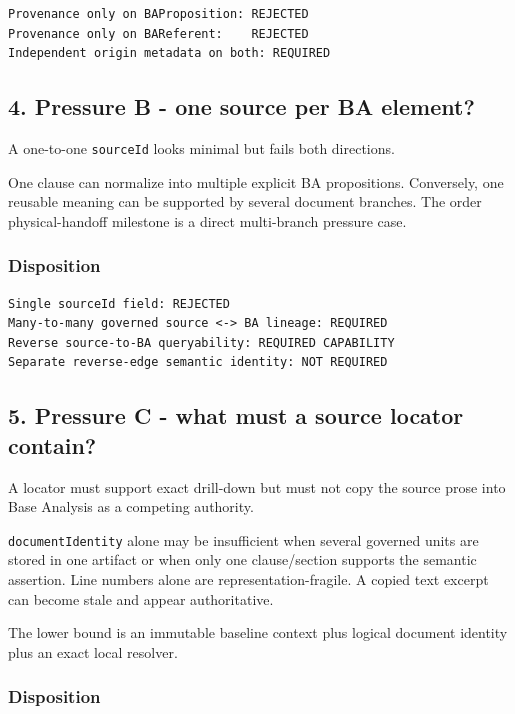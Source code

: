 \documentclass[11pt,a4paper]{article}
\begin{document}
\begin{verbatim}
Provenance only on BAProposition: REJECTED
Provenance only on BAReferent:    REJECTED
Independent origin metadata on both: REQUIRED
\end{verbatim}

\subsection{4. Pressure B - one source per BA element?}\label{4-pressure-b---one-source-per-ba-element}

A one-to-one \texttt{sourceId} looks minimal but fails both directions.

One clause can normalize into multiple explicit BA propositions. Conversely, one reusable meaning can be supported by several document branches. The order physical-handoff milestone is a direct multi-branch pressure case.

\subsubsection{Disposition}\label{disposition-1}

\begin{verbatim}
Single sourceId field: REJECTED
Many-to-many governed source <-> BA lineage: REQUIRED
Reverse source-to-BA queryability: REQUIRED CAPABILITY
Separate reverse-edge semantic identity: NOT REQUIRED
\end{verbatim}

\subsection{5. Pressure C - what must a source locator contain?}\label{5-pressure-c---what-must-a-source-locator-contain}

A locator must support exact drill-down but must not copy the source prose into Base Analysis as a competing authority.

\texttt{documentIdentity} alone may be insufficient when several governed units are stored in one artifact or when only one clause/section supports the semantic assertion. Line numbers alone are representation-fragile. A copied text excerpt can become stale and appear authoritative.

The lower bound is an immutable baseline context plus logical document identity plus an exact local resolver.

\subsubsection{Disposition}\label{disposition-2}
\end{document}
